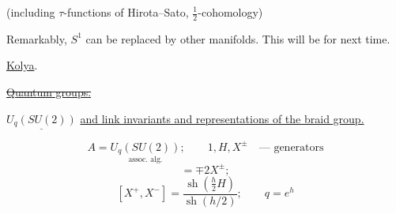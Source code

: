 (including \(\tau\)-functions of Hirota–Sato, \(\frac12\)-cohomology)

Remarkably, \(S^1\) can be replaced by other manifolds.
This will be for next time.

 \underline{Kolya}.

\uline{\sout{Quantum groups.}}

\(\underline{U_q(SU(2))}\) \uline{and link invariants and representations of the braid group.}

\[
 A=\underset{\text{assoc. alg.}}{U_q(SU(2))};\qquad
 1,H,X^\pm\quad\text{--- generators}
\]
\begin{equation*}
 [X^\pm,H]=\mp2X^\pm;\tag{1}
\end{equation*}
\[
 [X^+,X^-]=\frac{\operatorname{sh}\left(\frac h2 H\right)}{\operatorname{sh}(h/2)};
 \qquad q=e^h
\]


